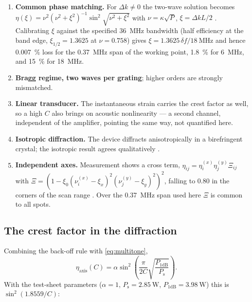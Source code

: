 \documentclass[11pt,a4paper]{article}
\newcommand{\crest}{\ensuremath{C}}
\begin{document}
\begin{enumerate}\itemsep1pt
\item \textbf{Common phase matching.} For $\Delta k\neq0$ the two-wave solution
      becomes
      $\eta(\xi)=\nu^2(\nu^2+\xi^2)^{-1}\sin^2\sqrt{\nu^2+\xi^2}$ with
      $\nu=\kappa\sqrt P$, $\xi=\Delta kL/2$ \citep{kogelnik1969}. Calibrating
      $\xi$ against the specified \SI{36}{\mega\hertz} bandwidth (half
      efficiency at the band edge, $\xi_{1/2}=1.3625$ at $\nu=0.758$) gives
      $\xi=1.3625\,\delta f/\SI{18}{\mega\hertz}$ and hence
      \SI{0.007}{\percent} loss for the \SI{0.37}{\mega\hertz} span of the
      working point, \SI{1.8}{\percent} for \SI{6}{\mega\hertz}, and
      \SI{15}{\percent} for \SI{18}{\mega\hertz}.
\item \textbf{Bragg regime, two waves per grating}; higher orders are strongly
      mismatched.
\item \textbf{Linear transducer.} The instantaneous strain carries the crest
      factor as well, so a high $\crest$ also brings on acoustic nonlinearity
      --- a second channel, independent of the amplifier, pointing the same
      way, not quantified here.
\item \textbf{Isotropic diffraction.} The device diffracts anisotropically in a
      birefringent crystal; the isotropic result agrees qualitatively
      \citep{chang1995}.
\item \textbf{Independent axes.} Measurement shows a cross term,
      $\eta_{ij}=\eta^{(x)}_i\eta^{(y)}_j\Xi_{ij}$ with
      $\Xi=(1-\xi_0(\nu^{(x)}_i-\xi_x)^2(\nu^{(y)}_j-\xi_y)^2)^2$, falling to
      $0.80$ in the corners of the scan range \citep{mittenbuehler2024}. Over
      the \SI{0.37}{\mega\hertz} span used here $\Xi$ is common to all spots.
\end{enumerate}

\subsection{The crest factor in the diffraction}
Combining the back-off rule with \eqref{eq:multitone},
\begin{equation}
\eta_\mathrm{axis}(\crest)=\alpha\sin^2\!\left(\frac{\pi}{2\crest}
\sqrt{\frac{P_\mathrm{1dB}}{P_\mathrm{s}}}\right) .
\end{equation}
With the test-sheet parameters ($\alpha=1$, $P_\mathrm{s}=\SI{2.85}{\watt}$,
$P_\mathrm{1dB}=\SI{3.98}{\watt}$) this is $\sin^2(1.8559/\crest)$:
\end{document}
